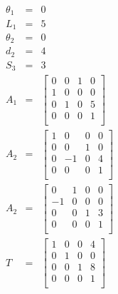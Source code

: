 \begin{eqnarray}
\theta_1&=&0 \\ 
L_1&=&5 \\ 
\theta_2&=&0 \\ 
d_2&=&4 \\ 
S_3&=&3 \\ 
A_1&=&\begin{bmatrix}
0&0&1&0\\ 
1&0&0&0\\ 
0&1&0&5\\ 
0&0&0&1\\ 
\end{bmatrix} \\ 
A_2&=&\begin{bmatrix}
1&0&0&0\\ 
0&0&1&0\\ 
0&-1&0&4\\ 
0&0&0&1\\ 
\end{bmatrix} \\ 
A_2&=&\begin{bmatrix}
0&1&0&0\\ 
-1&0&0&0\\ 
0&0&1&3\\ 
0&0&0&1\\ 
\end{bmatrix} \\ 
T&=&\begin{bmatrix}
1&0&0&4\\ 
0&1&0&0\\ 
0&0&1&8\\ 
0&0&0&1\\ 
\end{bmatrix}
\end{eqnarray}
